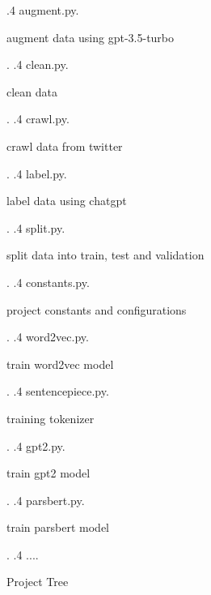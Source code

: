 \documentclass[12pt, letterpaper]{article}
\begin{document}
\begin{figure}[H]
{            .4 augment.py.\dotfill\begin{minipage}[t]{5cm}
                                      augment data using gpt-3.5-turbo
            \end{minipage}.
            .4 clean.py.\dotfill\begin{minipage}[t]{5cm}
                                    clean data
            \end{minipage}.
            .4 crawl.py.\dotfill\begin{minipage}[t]{5cm}
                                    crawl data from twitter
            \end{minipage}.
            .4 label.py.\dotfill\begin{minipage}[t]{5cm}
                                    label data using chatgpt
            \end{minipage}.
            .4 split.py.\dotfill\begin{minipage}[t]{5cm}
                                    split data into train, test and validation
            \end{minipage}.
            .4 constants.py.\dotfill\begin{minipage}[t]{5cm}
                                        project constants and configurations
            \end{minipage}.
            .4 word2vec.py.\dotfill\begin{minipage}[t]{5cm}
                                       train word2vec model
            \end{minipage}.
            .4 sentencepiece.py.\dotfill\begin{minipage}[t]{5cm}
                                        training tokenizer
            \end{minipage}.
            .4 gpt2.py.\dotfill\begin{minipage}[t]{5cm}
                                   train gpt2 model
            \end{minipage}.
            .4 parsbert.py.\dotfill\begin{minipage}[t]{5cm}
                                       train parsbert model
            \end{minipage}.
            .4 ....
        }
        \caption{Project Tree}
    \end{figure}
\end{document}
